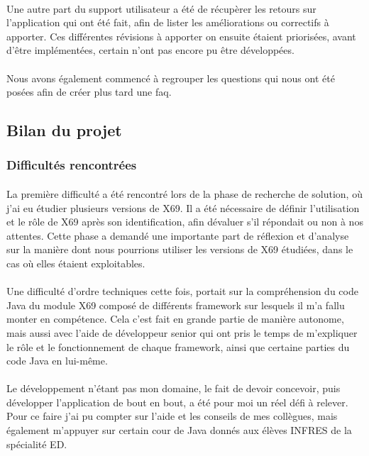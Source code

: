 \documentclass[12pt,a4paper]{report}
\begin{document}
\paragraph*{}Une autre part du support utilisateur a été de récupèrer les retours sur l'application qui ont été fait, afin de lister les améliorations ou correctifs à apporter. Ces différentes révisions à apporter on ensuite étaient priorisées, avant d'être implémentées, certain n'ont pas encore pu être développées.
\paragraph*{}Nous avons également commencé à regrouper les questions qui nous ont été posées afin de créer plus tard une \gls{faq}. \\ 

\subsection{Bilan du projet}
\subsubsection{Difficultés rencontrées}
\paragraph*{}La première difficulté a été rencontré lors de la phase de recherche de solution, où j'ai eu étudier plusieurs versions de X69. Il a été nécessaire de définir l’utilisation et le rôle de X69 après son identification, afin dévaluer s’il répondait ou non à nos attentes. Cette phase a demandé une importante part de réflexion et d’analyse sur la manière dont nous pourrions utiliser les versions de X69 étudiées, dans le cas où elles étaient exploitables.
\paragraph*{}Une difficulté d'ordre techniques cette fois, portait sur la compréhension du code Java du module X69 composé de différents framework sur lesquels il m'a fallu monter en compétence. Cela c'est fait en grande partie de manière autonome, mais aussi avec l'aide de développeur senior qui ont pris le temps de m'expliquer le rôle et le fonctionnement de chaque framework, ainsi que certaine parties du code Java en lui-même. 
\paragraph*{}Le développement n'étant pas mon domaine, le fait de devoir concevoir, puis développer l'application de bout en bout, a été pour moi un réel défi à relever. Pour ce faire j'ai pu compter sur l'aide et les conseils de mes collègues, mais également m'appuyer sur certain cour de Java donnés aux élèves INFRES de la spécialité ED. 
\end{document}
